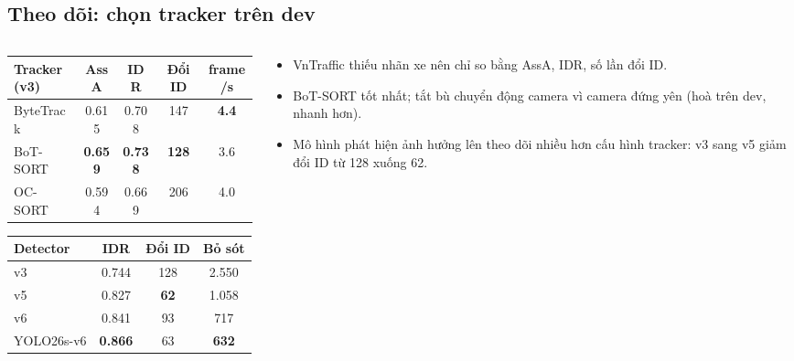 \documentclass[aspectratio=\mlwAspectRatio, \mlwBaseSize, t]{beamer}
\begin{document}
\subsection{Theo dõi: chọn tracker trên dev}
\begin{frame}{\stitle}
  \begin{columns}[T]
    \begin{column}{0.52\textwidth}
      \centering
      \footnotesize
      \begin{tabular}{@{}lcccc@{}}
        \toprule
        \textbf{Tracker (v3)} & \textbf{AssA} & \textbf{IDR} & \textbf{Đổi ID} & \textbf{frame/s} \\
        \midrule
        ByteTrack & 0.615 & 0.708 & 147 & \textbf{4.4} \\
        \rowcolor{HiRow}
        BoT-SORT & \textbf{0.659} & \textbf{0.738} & \textbf{128} & 3.6 \\
        OC-SORT & 0.594 & 0.669 & 206 & 4.0 \\
        \bottomrule
      \end{tabular}\par
      \vspace{0.7em}
      \begin{tabular}{@{}lccc@{}}
        \toprule
        \textbf{Detector} & \textbf{IDR} & \textbf{Đổi ID} & \textbf{Bỏ sót} \\
        \midrule
        v3 & 0.744 & 128 & 2.550 \\
        v5 & 0.827 & \textbf{62} & 1.058 \\
        v6 & 0.841 & 93 & 717 \\
        \rowcolor{HiRow}
        YOLO26s-v6 & \textbf{0.866} & 63 & \textbf{632} \\
        \bottomrule
      \end{tabular}
    \end{column}
    \begin{column}{0.44\textwidth}
      \begin{itemize}
        \item VnTraffic thiếu nhãn xe nên chỉ so bằng \alert{AssA, IDR, số lần đổi ID}.
        \item BoT-SORT tốt nhất; tắt bù chuyển động camera vì camera đứng yên (hoà trên dev, nhanh hơn).
        \item Mô hình phát hiện ảnh hưởng lên theo dõi \alert{nhiều hơn} cấu hình tracker: v3 sang v5 giảm đổi ID
              từ 128 xuống 62.
      \end{itemize}
    \end{column}
  \end{columns}
\end{frame}
\end{document}

